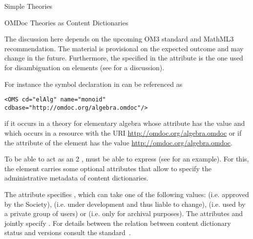 \begin{module}[id=theories]
\begin{omgroup}{Simple Theories}
\begin{omgroup}[id=identifying]{OMDoc Theories as Content Dictionaries}
\begin{oldpart}{The discussion here depends on the upcoming OM3 standard and MathML3
    recommendation. The material is provisional on the expected outcome and may change in
    the future.}
Furthermore, the {} specified in the  attribute
is the one used for disambiguation on  elements (see
 for a discussion).
  
For instance the symbol declaration in {} can be referenced as
\begin{lstlisting}
<OMS cd="elAlg" name="monoid" cdbase="http://omdoc.org/algebra.omdoc"/>
\end{lstlisting}
if it occurs in a theory for elementary algebra whose
 attribute has the value {} and which
occurs in a resource with the URI \url{http://omdoc.org/algebra.omdoc} or if the
 attribute of the  element has the value
\url{http://omdoc.org/algebra.omdoc}.

To be able to act as an {\openmath}2 {}, \omdoc must
be able to express {} (see {} for an
example). For this, the  element carries some optional attributes that
allow to specify the administrative metadata of {\openmath} content dictionaries.

\begin{omtext}
  The  attribute specifies , which can take one of the following values:
   (i.e. approved by the {\openmath} Society),
   (i.e. under development and thus liable to
  change),  (i.e. used by a private group of
  {\openmath} users) or  (i.e. only for archival
  purposes). The attributes  and
   jointly specify . For details between the
  relation between content dictionary status and versions consult the {\openmath}
  standard~\cite{BusCapCar:2oms04}.
\end{omtext}


\end{oldpart}
\end{omgroup}
\end{omgroup}
\end{module}
